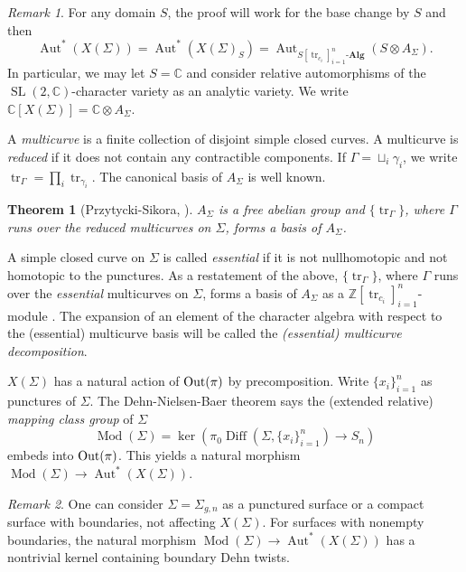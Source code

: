 \documentclass[11pt]{amsart}
\newtheorem{theorem}{Theorem}
\numberwithin{theorem}{section}
\theoremstyle{definition}
\theoremstyle{remark}
\newtheorem*{remark}{Remark}
\newcommand{\C}{{\mathbb{C}}}
\newcommand{\Z}{{\mathbb{Z}}}
\DeclareMathOperator{\Aut}{Aut}
\DeclareMathOperator{\Diff}{Diff}
\DeclareMathOperator{\Mod}{Mod}
\DeclareMathOperator{\Out}{\textup{Out}}
\DeclareMathOperator{\SL}{SL}
\DeclareMathOperator{\tr}{tr}
\newcommand{\<}{\langle}
\renewcommand{\>}{\rangle}
\begin{document}
\begin{remark}
    For any domain $S$, the proof will work for the base change by $S$ and then
    \[
    \Aut^*(X(\Sigma)) = \Aut^*(X(\Sigma)_S) = \Aut_{S[\tr_{c_i}]_{i=1}^n\text{-}\mathbf{Alg}}(S \otimes A_\Sigma).
    \]
    In particular, we may let $S = \C$ and consider relative automorphisms of the $\SL(2, \C)$-character variety as an analytic variety. We write $\C[X(\Sigma)] = \C \otimes A_\Sigma$.
\end{remark}

A \textit{multicurve} is a finite collection of disjoint simple closed curves. A multicurve is \textit{reduced} if it does not contain any contractible components. If $\Gamma = \sqcup_i \gamma_i$, we write $\tr_\Gamma = \prod_i \tr_{\gamma_i}$. The canonical basis of $A_\Sigma$ is well known.

\begin{theorem}[Przytycki-Sikora, \cite{przytycki1997skein}]
    $A_\Sigma$ is a free abelian group and $\{ \tr_\Gamma \}$, where $\Gamma$ runs over the reduced multicurves on $\Sigma$, forms a basis of $A_\Sigma$.
\end{theorem}

A simple closed curve on $\Sigma$ is called \textit{essential} if it is not nullhomotopic and not homotopic to the punctures. As a restatement of the above, $\{ \tr_\Gamma \}$, where $\Gamma$ runs over the \textit{essential} multicurves on $\Sigma$, forms a basis of $A_\Sigma$ as a $\Z[\tr_{c_i}]_{i=1}^n$-module . The expansion of an element of the character algebra with respect to the (essential) multicurve basis will be called the \textit{(essential) multicurve decomposition}.

$X(\Sigma)$ has a natural action of $\Out(\pi)$ by precomposition. Write $\{ x_i \}_{i=1}^n$ as punctures of $\Sigma$. The Dehn-Nielsen-Baer theorem says the (extended relative) \textit{mapping class group} of $\Sigma$
\[
\Mod(\Sigma) = \ker (\pi_0\Diff(\Sigma, \{x_i\}_{i=1}^n) \rightarrow S_n)
\]
embeds into $\Out(\pi)$. This yields a natural morphism $\Mod(\Sigma) \rightarrow \Aut^*(X(\Sigma))$.

\begin{remark}
    One can consider $\Sigma = \Sigma_{g,n}$ as a punctured surface or a compact surface with boundaries, not affecting $X(\Sigma)$. For surfaces with nonempty boundaries, the natural morphism $\Mod(\Sigma) \rightarrow \Aut^*(X(\Sigma))$ has a nontrivial kernel containing boundary Dehn twists.
\end{remark}
\end{document}
